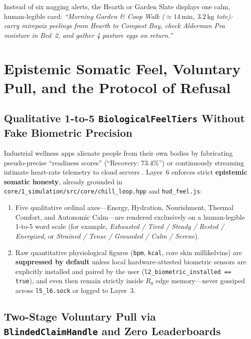 Instead of six nagging alerts, the Hearth or Garden Slate displays one calm, human-legible card: \textit{``Morning Garden \& Coop Walk ($\approx 14\,\mathrm{min}$, $3.2\,\mathrm{kg}$ tote): carry mirepoix peelings from Hearth to Compost Bay, check Alderman Pea moisture in Bed~2, and gather 4 pasture eggs on return.''}

\section{Epistemic Somatic Feel, Voluntary Pull, and the Protocol of Refusal}
\label{sec:feel-pull-refusal}

\subsection{Qualitative 1-to-5 \texttt{BiologicalFeelTiers} Without Fake Biometric Precision}

Industrial wellness apps alienate people from their own bodies by fabricating pseudo-precise ``readiness scores'' (``Recovery: $73.4\%$'') or continuously streaming intimate heart-rate telemetry to cloud servers \parencite{zuboff2019}. Layer~6 enforces strict \textbf{epistemic somatic honesty}, already grounded in \texttt{core/1\_simulation/src/core/chill\_loop.hpp} and \texttt{hud\_feel.js}:
\begin{enumerate}
    \item Five qualitative ordinal axes---Energy, Hydration, Nourishment, Thermal Comfort, and Autonomic Calm---are rendered exclusively on a human-legible 1-to-5 word scale (for example, \textit{Exhausted / Tired / Steady / Rested / Energized}, or \textit{Strained / Tense / Grounded / Calm / Serene}).
    \item Raw quantitative physiological figures (\texttt{bpm}, \texttt{kcal}, core skin millikelvins) are \textbf{suppressed by default} unless local hardware-attested biometric sensors are explicitly installed and paired by the user (\texttt{l2\_biometric\_installed == true}), and even then remain strictly inside $R_0$ edge memory---never gossiped across \texttt{l5\_l6.sock} or logged to Layer~3.
\end{enumerate}

\subsection{Two-Stage Voluntary Pull via \texttt{BlindedClaimHandle} and Zero Leaderboards}

